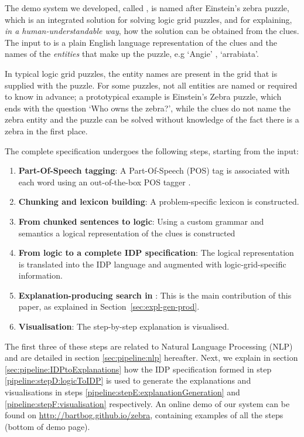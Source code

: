 The demo system we developed, called \ourtool, is named after Einstein's zebra puzzle, which is an integrated solution for solving logic grid puzzles, and for explaining, \textit{in a human-understandable way}, how the solution can be obtained from the clues. 
The input to \ourtool is a plain English language representation of the clues and the names of the \textit{entities} that make up the puzzle, e.g  `Angie' , `arrabiata'. 

In typical logic grid puzzles, the entity names are present in the grid that is supplied with the puzzle. For some puzzles, not all entities are named or required to know in advance; a prototypical example is Einstein's Zebra puzzle, which ends with the question `Who owns the zebra?', while the clues do not name the zebra entity and the puzzle can be solved without knowledge of the fact there is a zebra in the first place.

The complete specification undergoes the following steps, starting from the input:

\begin{enumerate}[label=\textbf{\Alph*},ref=\emph{Step~\Alph*}]
	\item \label{pipeline:stepA:POS} \textbf{Part-Of-Speech tagging}: A Part-Of-Speech (POS) tag is associated with each word using an out-of-the-box POS tagger \cite{DBLP:journals/coling/MarcusSM94}.
	\item \label{pipeline:stepB:chukingLexicon} \textbf{Chunking and lexicon building}: A problem-specific lexicon is constructed.
	\item \label{pipeline:stepC:ChunkedToLogic} \textbf{From chunked sentences to logic}: Using a custom grammar and semantics a logical representation of the clues is constructed
	\item \label{pipeline:stepD:logicToIDP} \textbf{From logic to a complete IDP specification}: The logical representation is translated into the IDP language and augmented with logic-grid-specific information.
	\item \label{pipeline:stepE:explanationGeneration} \textbf{Explanation-producing search in \idp}: This is the main contribution of this paper, as explained in Section~\ref{sec:expl-gen-prod}.
	\item \label{pipeline:stepF:visualisation} \textbf{Visualisation}: The step-by-step explanation is visualised. 
\end{enumerate}

The first three of these steps are related to Natural Language Processing (NLP) and are detailed in section \ref{sec:pipeline:nlp} hereafter. 
Next, we explain in section \ref{sec:pipeline:IDPtoExplanations} how the IDP specification formed in step \ref{pipeline:stepD:logicToIDP} is used to generate the explanations and visualisations in steps \ref{pipeline:stepE:explanationGeneration} and \ref{pipeline:stepF:visualisation} respectively.
An online demo of our system can be found on \url{http://bartbog.github.io/zebra}, containing examples of all the steps (bottom of demo page). 

